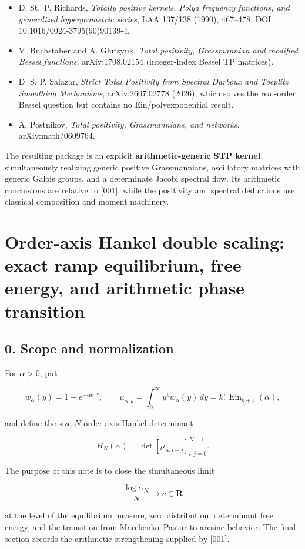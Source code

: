 \documentclass[11pt]{article}
\theoremstyle{keio}
\theoremstyle{definition}
\theoremstyle{remark}
\newcommand{\Ein}{\operatorname{Ein}}
\providecommand{\tightlist}{\setlength{\itemsep}{0pt}\setlength{\parskip}{0pt}}
\begin{document}
\begin{itemize}
\tightlist
\item
  D. St.~P. Richards, \emph{Totally positive kernels, Polya frequency functions,
  and generalized hypergeometric series}, LAA 137/138 (1990), 467--478,
  DOI 10.1016/0024-3795(90)90139-4.
\item
  V. Buchstaber and A. Glutsyuk, \emph{Total positivity, Grassmannian and modified
  Bessel functions}, arXiv:1708.02154 (integer-index Bessel TP matrices).
\item
  D. S. P. Salazar, \emph{Strict Total Positivity from Spectral Darboux and Toeplitz
  Smoothing Mechanisms}, arXiv:2607.02778 (2026), which solves the real-order
  Bessel question but contains no Ein/polyexponential result.
\item
  A. Postnikov, \emph{Total positivity, Grassmannians, and networks},
  arXiv:math/0609764.
\end{itemize}

The resulting package is an explicit \textbf{arithmetic-generic STP kernel}
simultaneously realizing generic positive Grassmannians, oscillatory matrices
with generic Galois groups, and a determinate Jacobi spectral flow.  Its
arithmetic conclusions are relative to [001], while the positivity and
spectral deductions use classical composition and moment machinery.
\section{Order-axis Hankel double scaling: exact ramp equilibrium, free energy, and arithmetic phase transition}

\subsection{0. Scope and normalization}

For \(\alpha>0\), put

\[
w_\alpha(y)=1-e^{-\alpha e^{-y}},\qquad
\mu_{\alpha,k}=\int_0^\infty y^k w_\alpha(y)\,dy
=k!\,\Ein_{k+1}(\alpha),
\]

and define the size-\(N\) order-axis Hankel determinant

\[
H_N(\alpha)=\det[\mu_{\alpha,i+j}]_{i,j=0}^{N-1}.
\]

The purpose of this note is to close the simultaneous limit

\[
\frac{\log\alpha_N}{N}\longrightarrow c\in\mathbf R
\]

at the level of the equilibrium measure, zero distribution, determinant
free energy, and the transition from Marchenko--Pastur to arcsine behavior.
The final section records the arithmetic strengthening supplied by {[}001{]}.
\end{document}
